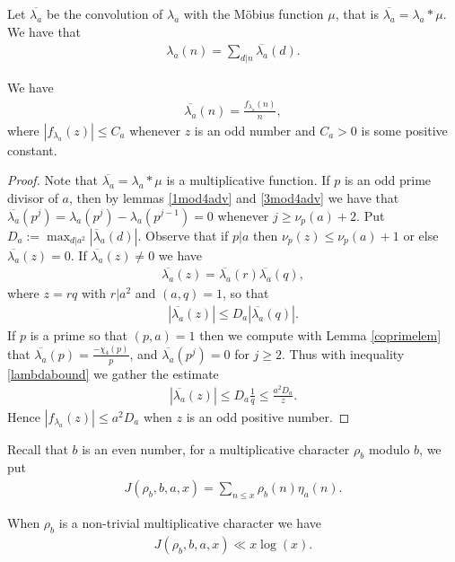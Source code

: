 \documentclass[12pt]{amsart}
\newcommand{\1}{\mathmybb{1}}
\begin{document}
Let $\overline{\lambda_{a}}$ be the convolution of $\lambda_{a}$ with the M\"obius function $\mu$, that is $\overline{\lambda_{a}} = \lambda_{a}*\mu$. We have that
\begin{align*}
\lambda_{a}(n) = \sum_{d|n}\overline{\lambda_{a}}(d).
\end{align*}
\begin{lem}
\label{lambdaconvbound}
We have
\begin{align*}
\overline{\lambda_{a}}(n) = \frac{f_{\lambda_{a}}(n)}{n},
\end{align*}
where $|f_{\lambda_{a}}(z)| \leq C_{a}$ whenever $z$ is an odd number and $C_{a}>0$ is some positive constant.
\end{lem}
\begin{proof}
Note that $\overline{\lambda_{a}} = \lambda_{a}*\mu$ is a multiplicative function. If $p$ is an odd prime divisor of $a$, then by lemmas \ref{1mod4adv} and \ref{3mod4adv} we have that $\overline{\lambda_{a}}(p^{j}) = \lambda_{a}(p^{j}) - \lambda_{a}(p^{j-1}) = 0$ whenever $j \geq \nu_{p}(a)+2$. Put $D_{a} := \max_{d|a^2}\left|\overline{\lambda}_{a}(d)\right|$. Observe that if $p|a$ then $\nu_{p}(z) \leq \nu_{p}(a) + 1$ or else $\overline{\lambda_{a}}(z) = 0$. If $\overline{\lambda_{a}}(z) \neq 0$ we have
\begin{align*}
\overline{\lambda_{a}}(z) = \overline{\lambda_{a}}(r)\overline{\lambda_{a}}(q),
\end{align*}
where $z = rq$ with $r|a^2$ and $(a,q) = 1$, so that 
\begin{align}
\label{lambdabound}
|\overline{\lambda_{a}}(z)| \leq D_{a}|\overline{\lambda_{a}}(q)|.
\end{align}
If $p$ is a prime so that $(p,a) = 1$ then we compute with Lemma \ref{coprimelem} that $\overline{\lambda_{a}}(p) = \frac{-\chi_{4}(p)}{p}$, and $\overline{\lambda_{a}}(p^{j}) = 0$ for $j \geq 2$. Thus with inequality \eqref{lambdabound} we gather the estimate 
\begin{align*}
|\overline{\lambda_{a}}(z)| \leq D_{a}\frac{1}{q} \leq \frac{a^2D_{a}}{z}.
\end{align*}
Hence $|f_{\lambda_{a}}(z)| \leq a^2 D_{a}$ when $z$ is an odd positive number.
\end{proof}
Recall that $b$ is an even number, for a multiplicative character $\rho_{b}$ modulo $b$, we put
\begin{align*}
J(\rho_{b},b,a,x) = \sum_{n\leq x} \rho_{b}(n)\eta_{a}(n).
\end{align*}
\begin{lem}
\label{Twistedsumlem}
When $\rho_{b}$ is a non-trivial multiplicative character we have
\begin{align*}
J(\rho_{b},b,a,x) \ll x \log(x).
\end{align*}
\end{lem}
\end{document}
